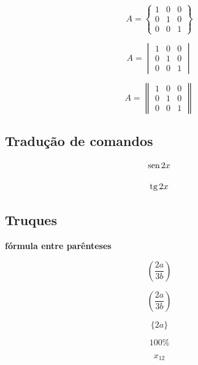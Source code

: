 \documentclass[12pt]{article}
\renewcommand{\sin}{\mathrm{sen\hspace{0.5mm}}}
\renewcommand{\tan}{\mathrm{tg\hspace{0.5mm}}}
\begin{document}
\begin{equation}
	A = \begin{Bmatrix}
		1 & 0  & 0  \\
		0 & 1  & 0  \\
		0 & 0  & 1 
	\end{Bmatrix}
\end{equation}

\begin{equation}
	A = \begin{vmatrix}
		1 & 0  & 0  \\
		0 & 1  & 0  \\
		0 & 0  & 1 
	\end{vmatrix}
\end{equation}

\begin{equation}
	A = \begin{Vmatrix}
		1 & 0  & 0  \\
		0 & 1  & 0  \\
		0 & 0  & 1 
	\end{Vmatrix}
\end{equation}

\subsection[Tradução de Comandos]{Tradução de comandos}

\begin{equation}
\sin{2x}
\end{equation}

\begin{equation}
	\tan{2x}
\end{equation}

\subsection[Truques]{Truques}

\textbf{fórmula entre parênteses}

\begin{equation}
	(\frac{2a}{3b})
\end{equation}

\begin{equation}
	\left(\frac{2a}{3b}\right)
\end{equation}

\begin{equation}
\{2a\}
\end{equation}

\begin{equation}
	100\%
\end{equation}

\begin{equation}
	x_{12}
\end{equation}
	
\end{document}
